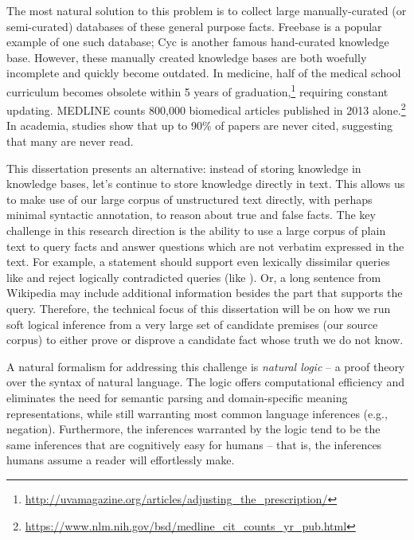 The most natural solution to this problem is to collect large manually-curated
  (or semi-curated) databases of these general purpose facts.
Freebase \cite{key:2008bollacker-freebase} is a popular example of one
  such database; Cyc \cite{key:1995lenat-cyc} is another famous hand-curated
  knowledge base.
However, these manually created knowledge bases are both woefully incomplete 
  and quickly become outdated.
In medicine, half of the medical school curriculum becomes obsolete within 5 
  years of graduation,\footnote{
    \url{http://uvamagazine.org/articles/adjusting\_the\_prescription/}
  }
  requiring constant updating.
  MEDLINE counts 800,000 biomedical articles published in 2013 alone.\footnote{
    \url{https://www.nlm.nih.gov/bsd/medline\_cit\_counts\_yr\_pub.html}
  }
In academia, studies show that up to 90\% of papers are never 
  cited, suggesting that many are never read.

This dissertation presents an alternative:
  instead of storing knowledge in knowledge bases, let's continue to store knowledge
  directly in text.
This allows us to make use of our large corpus of unstructured text directly, with
  perhaps minimal syntactic annotation, to reason about true and false facts.
The key challenge in this research direction is the ability to use a large 
  corpus of plain text to query facts and answer questions which are not verbatim 
  expressed in the text.
For example, a statement  should support even lexically 
  dissimilar queries like  and reject logically 
  contradicted queries (like ).
Or, a long sentence from Wikipedia may include additional information besides 
  the part that supports the query.
Therefore, the technical focus of this dissertation will be on how we run soft logical
  inference from a very large set of candidate premises (our source corpus) to either
  prove or disprove a candidate fact whose truth we do not know.

A natural formalism for addressing this challenge is \textit{natural logic} -- a proof 
  theory over the syntax of natural language.
The logic offers computational efficiency and eliminates the need for semantic 
  parsing and domain-specific meaning representations, while still warranting most 
  common language inferences (e.g., negation). 
Furthermore, the inferences warranted by the logic tend to be 
  the same inferences that are cognitively easy for humans -- that is, 
  the inferences humans assume a reader will effortlessly make.

